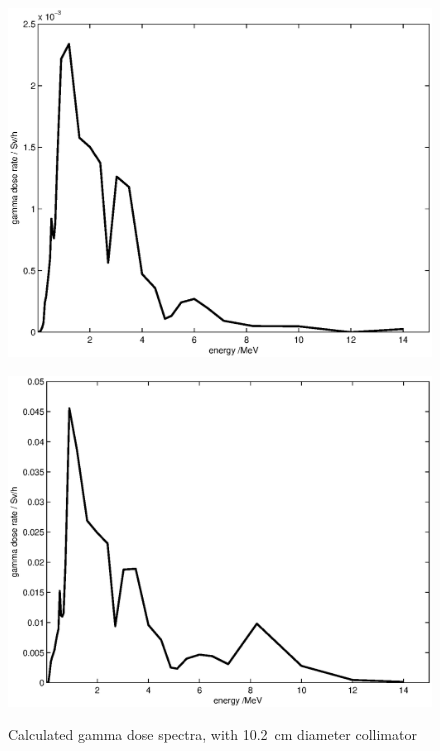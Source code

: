 \documentclass[peerreviewca,11pt,a4paper]{IEEEtran}
\let\MYoriglatexcaption\caption
\renewcommand{\caption}[2][\relax]{\MYoriglatexcaption[#2]{#2}}
\begin{document}
\begin{figure}[t]
    \begin{minipage}{\columnwidth}
        \centering
        \includegraphics[width=0.9\columnwidth]{DoseVSenergySUP.eps}
        \label{fig:GammaDoseEnergySUP}
    \end{minipage}
    \begin{minipage}{\columnwidth}
        \centering
        \includegraphics[width=0.9\columnwidth]{DoseVSenergyCUP.eps}
        \label{fig:GammaDoseEnergyCUP}
    \end{minipage}
    \caption{
        Calculated gamma dose spectra, with
        \SI{10.2}{\cm} diameter collimator
    }
    \label{fig:GammaDoseEnergy}
\end{figure}
\end{document}

